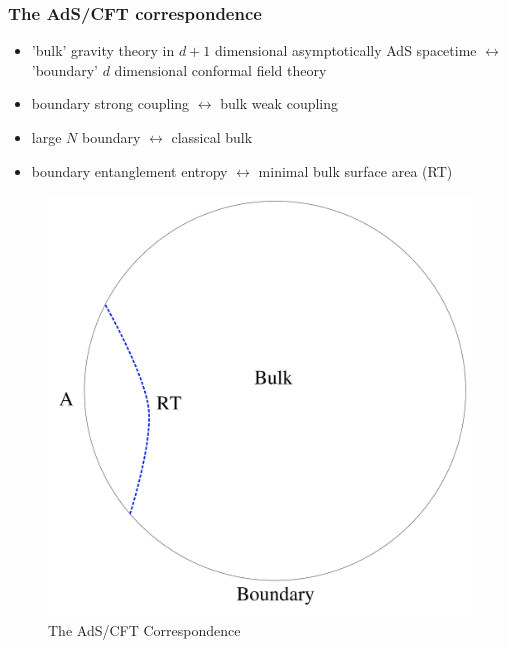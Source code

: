 \documentclass[10pt,aspectratio=169]{beamer}
\begin{document}
\begin{frame}
\frametitle{The AdS/CFT correspondence}

\begin{minipage}[t]{0.48\linewidth}

\begin{itemize}

\item 'bulk' gravity theory in $d+1$ dimensional  asymptotically AdS spacetime $\leftrightarrow$ 'boundary' $d$ dimensional conformal field theory

\item boundary strong coupling $\leftrightarrow$ bulk weak coupling

\item large $N$ boundary $\leftrightarrow$ classical bulk

\item boundary entanglement entropy $\leftrightarrow$ minimal bulk surface area (RT)

\end{itemize}

\end{minipage}
%
\hfill
%
\begin{minipage}[t]{0.48\linewidth}

\begin{figure}
    \begin{center}
    
        \includegraphics[scale=0.06]{adscft4}    
    
    \end{center}
    \caption{The AdS/CFT Correspondence}
\end{figure}

\end{minipage}

\end{frame}
\end{document}

